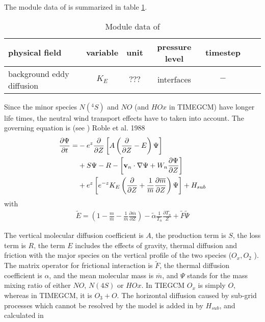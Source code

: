 %
%
The module data of  is summarized in table
\ref{tab:module_minor}.
%
\begin{table}[tb]
\begin{tabular}{|p{3.5cm} ||c|c|c|c|c|c|} \hline
physical field               & variable        & unit&pressure
level& timestep \\ \hline \hline background eddy diffusion    &
{$K_E$} & $???$   & interfaces  & $-$
\\ \hline \hline
\end{tabular}
\caption{Module data of }
\label{tab:module_minor}
\end{table}
%
Since the minor species $N(^4S)$ and $NO$ (and $HOx$ in TIMEGCM) 
have longer life times,
the neutral wind transport effects have to taken into account. The
governing equation is (see \cite{roble1988}) Roble et al. 1988
%
\begin{align}
  \frac{\partial {\Psi}}{\partial t} = &-e^{z}\frac{\partial}{\partial
  Z}\left[ {A} \left(\frac{\partial}{\partial Z} -
  {E}\right){\Psi}\right] \notag \\
{}& + {S}{\Psi} - {R} - \left[ \mathbf{v}_n \cdot
\nabla {\Psi} + W_n \frac{\partial {\Psi}}{\partial
Z}\right] \notag \\
{} & + e^z \left[ e^{-z} K_E \left( \frac{\partial}{\partial Z} +
\frac{1}{\overline{m}}\frac{\partial \overline{m}}{\partial
Z}\right){\Psi}\right] + H_{sub} \label{eq:minor_goveq}
\end{align}
%
with
%
\begin{align}
  \tilde{E} = \left( 1-\frac{{m}}{\overline{m}} -
  \frac{1}{\overline{m}}\frac{\partial \overline{m}}{\partial
  Z}\right) - \tilde{\alpha}\frac{1}{T_n}\frac{\partial T_n}{Z} +
  \tilde{F}\tilde{\Psi} \label{eq:minor_tildeE}
\end{align}
%

The vertical molecular diffusion coefficient is ${A}$, the
production term is ${S}$, the loss term is ${R}$, the
term ${E}$ includes the effects of gravity, thermal diffusion
and friction with the major species on the vertical profile of the
two species ($O_x, O_2$ ). The matrix operator for frictional interaction is
$\tilde{F}$, the thermal diffusion coefficient is ${\alpha}$,
and the mean molecular mass is $\overline{m}$, and $\Psi$ stands for the mass
mixing ratio of either $NO$, $N(4S)$ or $HOx$. In TIEGCM $O_x$ is simply $O$,
whereas in TIMEGCM, it is $O_3+O$. The horizontal diffusion caused by
sub-grid processes which cannot be resolved by the model is added in by
$H_{sub}$, and calculated in  \\

